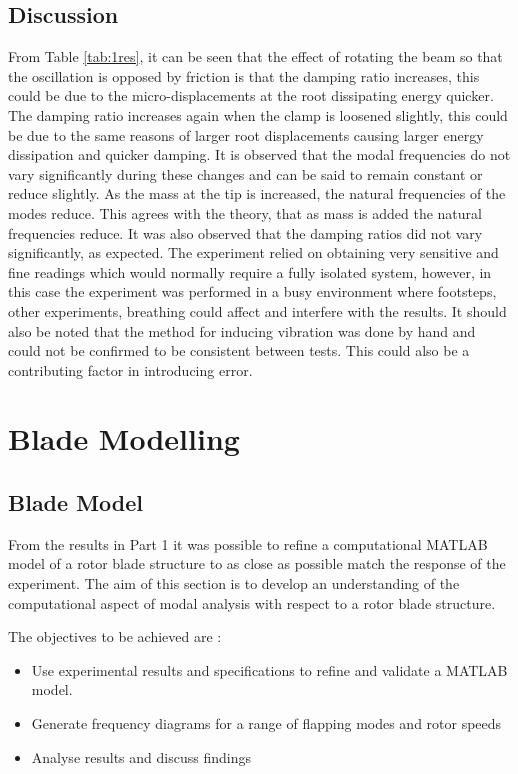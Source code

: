 \documentclass[11pt]{article}
\begin{document}
\subsection{Discussion}

From Table \ref{tab:1res}, it can be seen that the effect of rotating the beam so that the oscillation is opposed by friction is that the damping ratio increases, this could be due to the micro-displacements at the root dissipating energy quicker. The damping ratio increases again when the clamp is loosened slightly, this could be due to the same reasons of larger root displacements causing larger energy dissipation and quicker damping. It is observed that the modal frequencies do not vary significantly during these changes and can be said to remain constant or reduce slightly.
As the mass at the tip is increased, the natural frequencies of the modes reduce. This agrees with the theory, that as mass is added the natural frequencies reduce. It was also observed that the damping ratios did not vary significantly, as expected. The experiment relied on obtaining very sensitive and fine readings which would normally require a fully isolated system, however, in this case the experiment was performed in a busy environment where footsteps, other experiments, breathing could affect and interfere with the results. It should also be noted that the method for inducing vibration was done by hand and could not be confirmed to be consistent between tests. This could also be a contributing factor in introducing error.

\section{Blade Modelling}
\subsection{Blade Model}
From the results in Part 1 it was possible to refine a computational MATLAB model of a rotor blade structure to as close as possible match the response of the experiment.
The aim of this section is to develop an understanding of the computational aspect of modal analysis with respect to a rotor blade structure.

The objectives to be achieved are :

\begin{itemize}
\itemsep0em
    \item Use experimental results and specifications to refine and validate a MATLAB model.
    \item Generate frequency diagrams for a range of flapping modes and rotor speeds
    \item Analyse results and discuss findings
\end{itemize}{}
\end{document}

